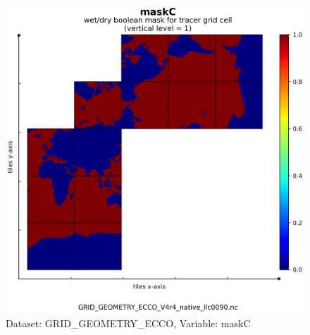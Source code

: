 \begin{figure}[H]
\centering
\includegraphics[scale=0.55]{../images/plots/v4r4/native_plots_coords/Geometry_Parameters_for_the_Lat-Lon-Cap_90_(llc90)_Native_Model_Grid_(Version_4_Release_4)/maskC.png}
\caption{Dataset: GRID\_GEOMETRY\_ECCO, Variable: maskC}
\label{tab:table-GRID_GEOMETRY_ECCO_maskC-Plot}
\end{figure}
\newpage
\pagebreak
